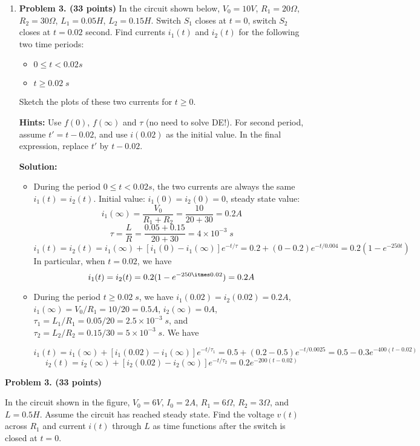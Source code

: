 \begin{enumerate}
\item {\bf Problem 3. (33 points)} In the circuit shown below, $V_0=10V$,
$R_1=20\Omega$, $R_2=30\Omega$, $L_1=0.05H$, $L_2=0.15H$. Switch $S_1$ 
closes at $t=0$, switch $S_2$ closes at $t=0.02$ second. Find currents 
$i_1(t)$ and $i_2(t)$ for the following two time periods:
\begin{itemize}
\item $0\le t < 0.02 s$
\item $t \ge 0.02\;s$ 
\end{itemize}
Sketch the plots of these two currents for $t \ge 0$.

{\bf Hints:} Use $f(0)$, $f(\infty)$ and $\tau$ (no need to solve DE!).
For second period, assume $t'=t-0.02$, and use $i(0.02)$ as the initial 
value. In the final expression, replace $t'$ by $t-0.02$.


{\bf Solution:}
\begin{itemize}
\item During the period $0\le t < 0.02 s$, the two currents are always the same
	$i_1(t)=i_2(t)$. Initial value: $i_1(0)=i_2(0)=0$, steady state value:
\[ i_1(\infty)=\frac{V_0}{R_1+R_2}=\frac{10}{20+30}=0.2A	\]
\[ \tau=\frac{L}{R}=\frac{0.05+0.15}{20+30}=4\times 10^{-3}\;s 	\]
\[ i_1(t)=i_2(t)=i_1(\infty)+[i_1(0)-i_1(\infty)]e^{-t/\tau}
	=0.2+(0-0.2) e^{-t/0.004}=0.2(1-e^{-250t})	\]
In particular, when $t=0.02$, we have
\[ i_1(t)=i_2(t)=0.2(1-e^{-250\itmes 0.02})=0.2A	\]

\item During the period $t \ge 0.02\;s$, we have $i_1(0.02)=i_2(0.02)=0.2A$, 
	$i_1(\infty)=V_0/R_1=10/20=0.5A$, $i_2(\infty)=0A$,
	$\tau_1=L_1/R_1=0.05/20=2.5\times 10^{-3}\;s$, and 
	$\tau_2=L_2/R_2=0.15/30=5\times 10^{-3}\;s$. We have

\[	i_1(t)=i_1(\infty)+[i_1(0.02)-i_1(\infty)]e^{-t/\tau_1}
	=0.5+(0.2-0.5)e^{-t/0.0025}=0.5-0.3e^{-400(t-0.02)} \]
\[	i_2(t)=i_2(\infty)+[i_2(0.02)-i_2(\infty)]e^{-t/\tau_2}	
	=0.2 e^{-200(t-0.02)}	\]

\end{itemize}




\end{enumerate}



\item {\bf Problem 3. (33 points)} 

In the circuit shown in the figure, $V_0=6V$, $I_0=2A$, $R_1=6\Omega$, 
$R_2=3\Omega$, and $L=0.5H$. Assume the circuit has reached steady state.
Find the voltage $v(t)$ across $R_1$ and current $i(t)$ through $L$ as 
time functions after the switch is closed at $t=0$.


